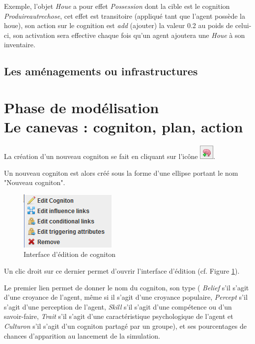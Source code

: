 	Exemple, l'objet \textit{Houe} a pour effet \textit{Possession} dont la cible est le cognition \textit{Produireautrechose}, cet effet est transitoire (appliqué tant que l'agent possède la houe), son action sur le cognition est \textit{add} (ajouter) la valeur 0.2 au poids de celui-ci, son activation sera effective chaque fois qu'un agent ajoutera une \textit{Houe} à son inventaire.

\newpage
	
	
\subsection{Les aménagements ou infrastructures}	
		
	
\section{Phase de modélisation \\ Le canevas : cogniton, plan, action}

	La création d'un nouveau cogniton se fait en cliquant sur l'icône \includegraphics{DocumentationSimulation/images/newcogni.png}. 
	
	Un nouveau cogniton est alors créé sous la forme d'une ellipse portant le nom "Nouveau cogniton". 
	
\begin{figure}[!ht]
	\begin{center}
	\includegraphics[scale=0.6]{DocumentationSimulation/images/interface.png}
	\caption[Interface]{Interface d'édition de cogniton\\}
	\label{Interface d'édition de cogniton}
	\end{center}
	\end{figure}

Un clic droit sur ce dernier permet d'ouvrir l'interface d'édition (cf. Figure \ref{Interface d'édition de cogniton}). 

Le premier lien permet de donner le nom du cogniton, son type (\textit{ Belief} s'il s'agit d'une croyance de l'agent, même si il s'agit d'une croyance populaire, \textit{Percept} s'il s'agit d'une perception de l'agent, \textit{Skill} s'il s'agit d'une compétence ou d'un savoir-faire, \textit{Trait} s'il s'agit d'une caractéristique psychologique de l'agent et \textit{Culturon} s'il s'agit d'un cogniton partagé par un groupe), et ses pourcentages de chances d'apparition au lancement de la simulation.

